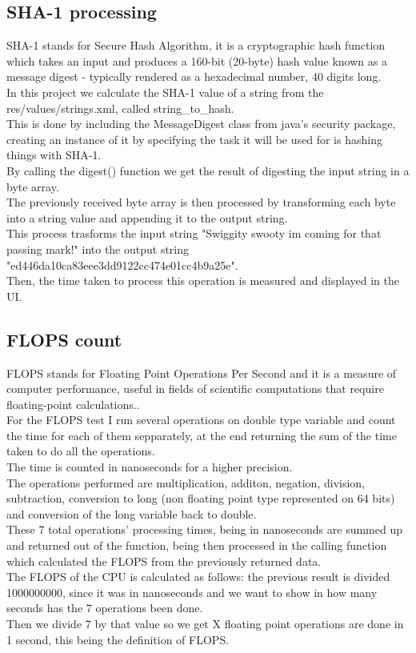 \documentclass[a4paper,10pt]{report}
\begin{document}
 \subsection{SHA-1 processing}
 SHA-1 stands for Secure Hash Algorithm, it is a cryptographic hash function which takes an input and produces a 160-bit (20-byte) hash value known as a message digest - typically rendered as a hexadecimal number, 40 digits long.\\
 In this project we calculate the SHA-1 value of a string from the res/values/strings.xml, called string\_to\_hash.\\
 This is done by including the MessageDigest class from java's security package, creating an instance of it by specifying the task it will be used for is hashing things with SHA-1.\\
 By calling the digest() function we get the result of digesting the input string in a byte array.\\
 The previously received byte array is then processed by transforming each byte into a string value and appending it to the output string.\\
 This process trasforms the input string "Swiggity swooty im coming for that passing mark!" into the output string "ed446da10ca83eee3dd9122cc474e01cc4b9a25e".\\
 Then, the time taken to process this operation is measured and displayed in the UI.
 
 \subsection{FLOPS count}
 FLOPS stands for Floating Point Operations Per Second and it is a measure of computer performance, useful in fields of scientific computations that require floating-point calculations..\\
 For the FLOPS test I run several operations on double type variable and count the time for each of them sepparately, at the end returning the sum of the time taken to do all the operations.\\
 The time is counted in nanoseconds for a higher precision.\\
 The operations performed are multiplication, additon, negation, division, subtraction, conversion to long (non floating point type represented on 64 bits) and conversion of the long variable back to double.\\
 These 7 total operations' processing times, being in nanoseconds are summed up and returned out of the function, being then processed in the calling function which calculated the FLOPS from the previously returned data.\\
 The FLOPS of the CPU is calculated as follows: the previous result is divided 1000000000, since it was in nanoseconds and we want to show in how many seconds has the 7 operations been done.\\
 Then we divide 7 by that value so we get X floating point operations are done in 1 second, this being the definition of FLOPS.\\
 
\end{document}
